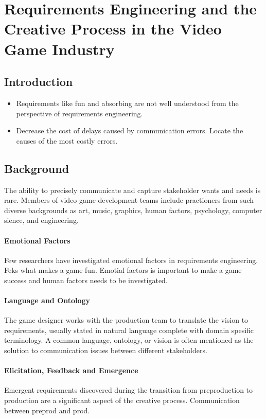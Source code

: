 \chapter*{Requirements Engineering and the Creative Process in the Video Game Industry}
  
  \section*{Introduction}

    \begin{itemize}
      \item Requirements like fun and absorbing are not well understood from the perspective of requirements engineering. 
      \item Decrease the cost of delays caused by communication errors. Locate the causes of the most costly errors.
    \end{itemize}

  \section*{Background}

    The ability to precisely communicate and capture stakeholder wants and needs is rare. Members of video game development teams include practioners from such diverse backgrounds as art, music, graphics, human factors, psychology, computer sience, and engineering. 

    \subsubsection*{Emotional Factors}
    Few researchers have investigated emotional factors in requirements engineering. Feks what makes a game fun. Emotial factors is important to make a game success and human factors needs to be investigated.

    \subsubsection*{Language and Ontology}
    The game designer works with the production team to translate the vision to requirements, usually stated in natural language complete with domain spesific terminology. A common language, ontology, or vision is often mentioned as the solution to communication issues between different stakeholders. 

    \subsubsection*{Elicitation, Feedback and Emergence}
    Emergent requirements discovered during the transition from preproduction to production are a significant aspect of the creative process. Communication between preprod and prod.

